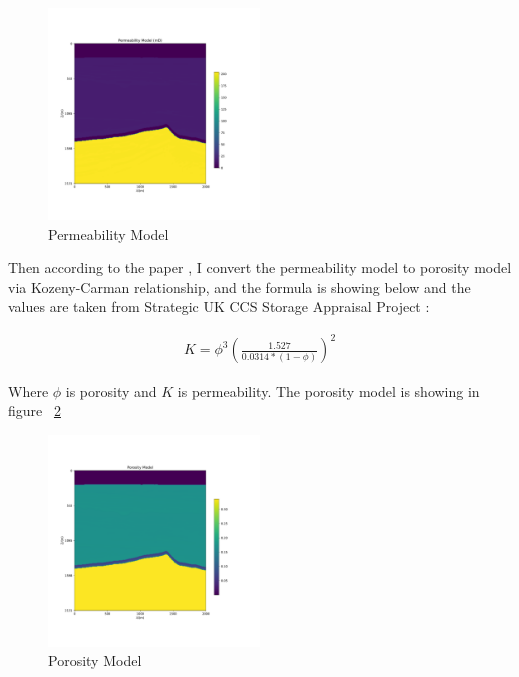 \begin{figure}[H]
    \centering
    \includegraphics[width=0.5\textwidth]{figures/project/Permeability_Model.pdf}
    \caption{Permeability Model}
    \label{fig:Permeability_Model}
\end{figure}

Then according to the paper \citep{costa2006permeability}, I convert the permeability model to porosity model via
Kozeny-Carman relationship, and the formula is showing below and the values are taken from Strategic UK CCS Storage Appraisal Project \citep{UKreport2016}:

\begin{align}
    K = \phi^3 {( \frac{ 1.527 }{ 0.0314*(1-\phi)} )}^2
    \label{equ:KC}
\end{align}


Where $\phi$ is porosity and $K$ is permeability. The porosity model is showing in figure ~\ref{fig:Porosity_Model}

\begin{figure}[H]
    \centering
    \includegraphics[width=0.5\textwidth]{figures/project/Porosity_Model.pdf}
    \caption{Porosity Model}
    \label{fig:Porosity_Model}
\end{figure}


